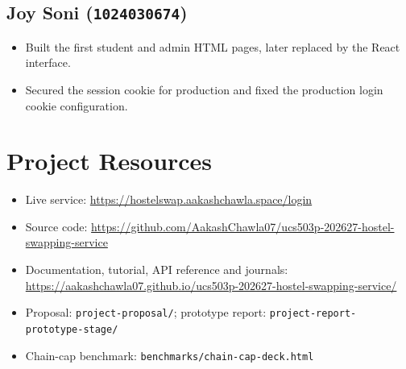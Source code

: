 \section*{Joy Soni (\texttt{1024030674})}
\begin{itemize}
  \item Built the first student and admin HTML pages, later replaced by
  the React interface.
  \item Secured the session cookie for production and fixed the
  production login cookie configuration.
\end{itemize}

\chapter{Project Resources}
\label{app:resources}

\begin{itemize}
  \item Live service: \url{https://hostelswap.aakashchawla.space/login}
  \item Source code: \url{https://github.com/AakashChawla07/ucs503p-202627-hostel-swapping-service}
  \item Documentation, tutorial, API reference and journals:
  \url{https://aakashchawla07.github.io/ucs503p-202627-hostel-swapping-service/}
  \item Proposal: \texttt{project-proposal/}; prototype report:
  \texttt{project-report-prototype-stage/}
  \item Chain-cap benchmark: \texttt{benchmarks/chain-cap-deck.html}
\end{itemize}
